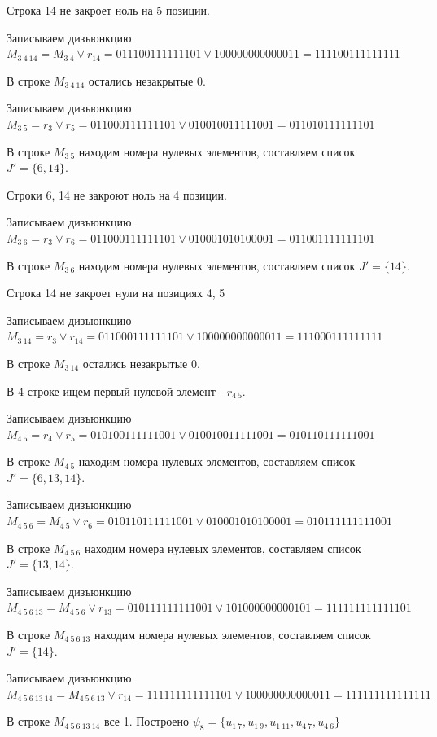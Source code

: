 \documentclass{article}
\begin{document}
Строка 14 не закроет ноль на 5 позиции.

Записываем дизъюнкцию $M_{3\ 4\ 14} = M_{3\ 4}\lor r_{14} = 011100111111101 \lor 100000000000011 = 111100111111111$

В строке $M_{3\ 4\ 14}$ остались незакрытые 0.

Записываем дизъюнкцию $M_{3\ 5} = r_{3}\lor r_{5} = 011000111111101 \lor 010010011111001 = 011010111111101$

В строке $M_{3\ 5}$ находим номера нулевых элементов, составляем список $J' = \{6, 14\}$.

Строки 6, 14 не закроют ноль на 4 позиции.

Записываем дизъюнкцию $M_{3\ 6} = r_{3}\lor r_{6} = 011000111111101 \lor 010001010100001 = 011001111111101$

В строке $M_{3\ 6}$ находим номера нулевых элементов, составляем список $J' = \{14\}$.

Строка 14 не закроет нули на позициях 4, 5

Записываем дизъюнкцию $M_{3\ 14} = r_{3}\lor r_{14} = 011000111111101 \lor 100000000000011 = 111000111111111$

В строке $M_{3\ 14}$ остались незакрытые 0.



В 4 строке ищем первый нулевой элемент - $r_{4\ 5}$.

Записываем дизъюнкцию $M_{4\ 5} = r_{4}\lor r_{5} = 010100111111001 \lor 010010011111001 = 010110111111001$

В строке $M_{4\ 5}$ находим номера нулевых элементов, составляем список $J' = \{6, 13, 14\}$.

Записываем дизъюнкцию $M_{4\ 5\ 6} = M_{4\ 5}\lor r_{6} = 010110111111001 \lor 010001010100001 = 010111111111001$

В строке $M_{4\ 5\ 6}$ находим номера нулевых элементов, составляем список $J' = \{13, 14\}$.

Записываем дизъюнкцию $M_{4\ 5\ 6\ 13} = M_{4\ 5\ 6}\lor r_{13} = 010111111111001 \lor 101000000000101 = 111111111111101$

В строке $M_{4\ 5\ 6\ 13}$ находим номера нулевых элементов, составляем список $J' = \{14\}$.

Записываем дизъюнкцию $M_{4\ 5\ 6\ 13\ 14} = M_{4\ 5\ 6\ 13}\lor r_{14} = 111111111111101 \lor 100000000000011 = 111111111111111$

В строке $M_{4\ 5\ 6\ 13\ 14}$ все 1. Построено $\psi_{8} = \{u_{1\ 7},u_{1\ 9},u_{1\ 11},u_{4\ 7},u_{4\ 6}\}$
\end{document}
